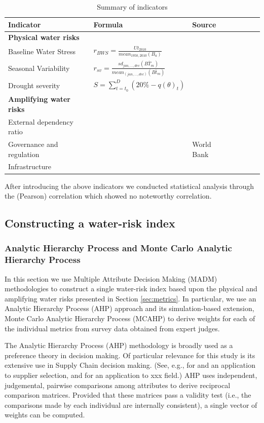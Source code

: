 \documentclass[a4paper]{article}
\begin{document}
\begin{table}[t]
\centering
\caption{Summary of indicators}
\label{tab:inv_regression} 
\resizebox{10cm}{!} {
\begin{tabular} { l l l l l l l } 
\toprule
Indicator & Formula & Source \\
\midrule
\textbf{Physical water risks} & & \\
Baseline Water Stress & $r_{BWS}=\frac{Ut_{2010}}{\mathit{mean}_{1950,2010}(B_a)}$ & \citet{Gassert:2014} \\
Seasonal Variability & $r_{sv}=\frac{\mathit{sd}_{jan,\dots,dec}(\bar{BT_m})}{\mathit{mean}_{(jan,\dots,dec)}(\bar{Bt_m})}$ & \citet{Gassert:2014} \\
Drought severity & $S= \sum_{t=t_0}^{D} (20\%-q(\theta)_t)$ & \citet{Gassert:2014} \\
\textbf{Amplifying water risks} && \\
External dependency ratio & & \citet{FAO:2016}\\
Governance and regulation & & World Bank \\
Infrastructure & & \citet{Diop:2002}\\
\bottomrule                                                                                                                                                 
\end{tabular}
}
\end{table}
After introducing the above indicators we conducted statistical analysis through the (Pearson) correlation which showed no noteworthy correlation.


\subsection{Constructing a water-risk index}
\subsubsection{Analytic Hierarchy Process and Monte Carlo Analytic Hierarchy Process}
In this section we use Multiple Attribute Decision Making (MADM) methodologies to construct a single water-risk index based upon the physical and amplifying water risks presented in Section \ref{sec:metrics}.
In particular, we use an Analytic Hierarchy Process (AHP) approach and its simulation-based extension, Monte Carlo Analytic Hierarchy Process (MCAHP) to derive weights for each of the individual metrics from survey data obtained from expert judges.

The Analytic Hierarchy Process (AHP) methodology is broadly used as a preference theory in decision making.
Of particular relevance for this study is its extensive use in Supply Chain decision making.
(See, e.g., \citet{Ishizaka:2011} for and an application to supplier selection, and \citet{Momani:2011} for an application to xxx field.)
AHP uses independent, judgemental, pairwise comparisons among attributes to derive reciprocal comparison matrices.
Provided that these matrices pass a validity test (i.e., the comparisons made by each individual are internally consistent), a single vector of weights can be computed.
\end{document}
